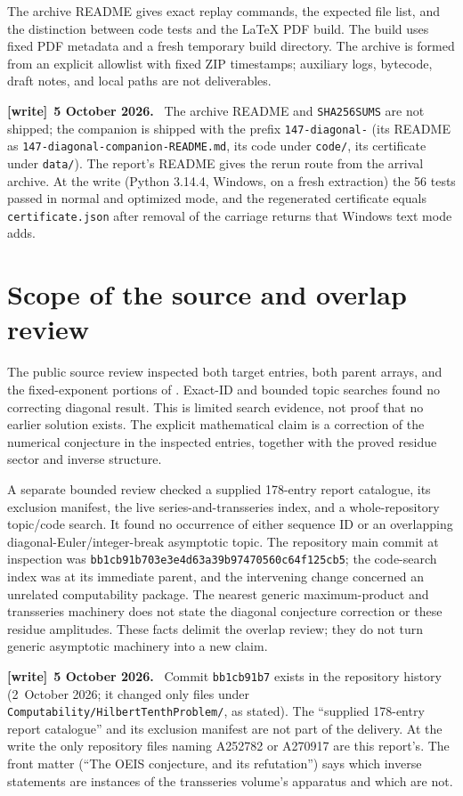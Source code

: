 \documentclass[11pt,letterpaper]{article}
\numberwithin{equation}{section}
\theoremstyle{definition}\newtheorem{definition}[theorem]{Definition}
\theoremstyle{remark}\newtheorem{remark}[theorem]{Remark}
\newcommand{\file}[1]{\nolinkurl{#1}}
\newenvironment{writenote}[1][]{\par\smallskip\begingroup\small
 \noindent\textbf{[write]}\if\relax\detokenize{#1}\relax\else~\textbf{#1.}\fi\ }%
 {\par\endgroup\smallskip}
\begin{document}
The archive README gives exact replay commands, the expected file list,
and the distinction between code tests and the LaTeX PDF build. The
build uses fixed PDF metadata and a fresh temporary build directory.
The archive is formed from an explicit allowlist with fixed ZIP timestamps;
auxiliary logs, bytecode, draft notes, and local paths are not deliverables.
\begin{writenote}[5 October 2026]
The archive README and \file{SHA256SUMS} are not shipped; the companion is shipped with the prefix \file{147-diagonal-} (its README as \file{147-diagonal-companion-README.md}, its code under \file{code/}, its certificate under \file{data/}). The report's README gives the rerun route from the arrival archive. At the write (Python 3.14.4, Windows, on a fresh extraction) the 56 tests passed in normal and optimized mode, and the regenerated certificate equals \file{certificate.json} after removal of the carriage returns that Windows text mode adds.
\end{writenote}

\section{Scope of the source and overlap review}\label{det:dia:sec:scope}
The public source review inspected both target entries, both parent
arrays, and the fixed-exponent portions of \cite{kotesovec}. Exact-ID
and bounded topic searches found no correcting diagonal result. This is
limited search evidence, not proof that no earlier solution exists.
The explicit mathematical claim is a correction of the numerical
conjecture in the inspected entries, together with the proved residue
sector and inverse structure.

A separate bounded review checked a supplied 178-entry report catalogue,
its exclusion manifest, the live series-and-transseries index, and a
whole-repository topic/code search. It found no occurrence of either
sequence ID or an overlapping diagonal-Euler/integer-break asymptotic
topic. The repository main commit at inspection was
\texttt{bb1cb91b703e3e4d63a39b97470560c64f125cb5}; the code-search index
was at its immediate parent, and the intervening change concerned an
unrelated computability package. The nearest generic maximum-product
and transseries machinery does not state the diagonal conjecture
correction or these residue amplitudes. These facts delimit the overlap
review; they do not turn generic asymptotic machinery into a new claim.
\begin{writenote}[5 October 2026]
Commit \texttt{bb1cb91b7} exists in the repository history (2~October 2026; it changed only files under \file{Computability/HilbertTenthProblem/}, as stated). The ``supplied 178-entry report catalogue'' and its exclusion manifest are not part of the delivery. At the write the only repository files naming A252782 or A270917 are this report's. The front matter (``The OEIS conjecture, and its refutation'') says which inverse statements are instances of the transseries volume's apparatus and which are not.
\end{writenote}
\end{document}
